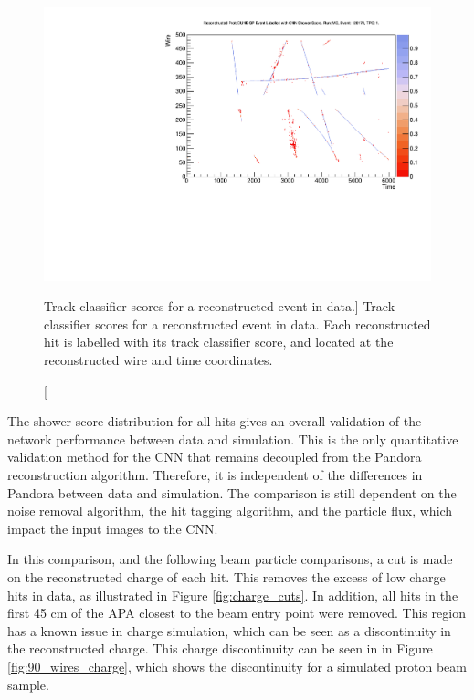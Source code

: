 \begin{figure}
	\centering
	\includegraphics[width=\textwidth]{figures/5387_image_tpc1_view2_128178.pdf}
	\caption
	[Track classifier scores for a reconstructed event in \protodune{} data.]
	{Track classifier scores for a reconstructed event in \protodune{} data. Each
	reconstructed hit is labelled with its track classifier score, and located at
	the reconstructed wire and time coordinates.}
	\label{fig:real_event}
\end{figure}

The shower score distribution for all hits gives an overall validation of the 
network performance between data and simulation. This is the only quantitative 
validation method for the CNN that remains decoupled from the Pandora 
reconstruction algorithm. Therefore, it is independent of the differences in 
Pandora between data and simulation. The comparison is still dependent on the 
noise removal algorithm, the hit tagging algorithm, and the particle flux, 
which impact the input images to the CNN.

In this comparison, and the following beam particle comparisons, a cut is made 
on the reconstructed charge of each hit. This removes the excess of low 
charge hits in data, as illustrated in Figure \ref{fig:charge_cuts}.  In 
addition, all hits in the first 45 cm of the APA closest to the beam entry 
point were removed. This region has a known issue in charge simulation, which 
can be seen as a discontinuity in the reconstructed charge. This charge 
discontinuity can be seen in in Figure \ref{fig:90_wires_charge}, which 
shows the discontinuity for a simulated proton beam sample.  

